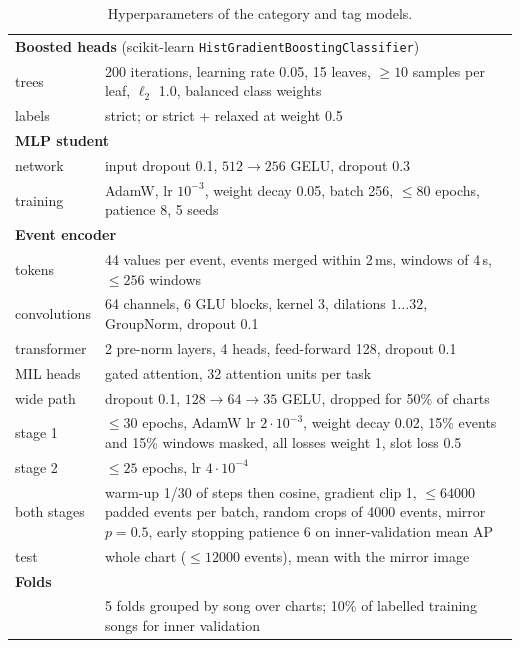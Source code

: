 \begin{table}[H]
\centering\footnotesize
\caption{Hyperparameters of the category and tag models.}
\label{tab:hparams}
\setlength\tabcolsep{4pt}
\begin{tabular}{p{}p{}}
\toprule
\multicolumn{2}{l}{\textbf{Boosted heads} (scikit-learn \texttt{HistGradientBoostingClassifier})} \\
trees & 200 iterations, learning rate 0.05, 15 leaves, $\ge10$ samples per leaf, $\ell_2$ 1.0, balanced class weights \\
labels & strict; or strict + relaxed at weight 0.5 \\
\midrule
\multicolumn{2}{l}{\textbf{MLP student}} \\
network & input dropout 0.1, $512\to256$ GELU, dropout 0.3 \\
training & AdamW, lr $10^{-3}$, weight decay 0.05, batch 256, $\le80$ epochs, patience 8, 5 seeds \\
\midrule
\multicolumn{2}{l}{\textbf{Event encoder}} \\
tokens & 44 values per event, events merged within 2\,ms, windows of 4\,s, $\le256$ windows \\
convolutions & 64 channels, 6 GLU blocks, kernel 3, dilations $1\dots32$, GroupNorm, dropout 0.1 \\
transformer & 2 pre-norm layers, 4 heads, feed-forward 128, dropout 0.1 \\
MIL heads & gated attention, 32 attention units per task \\
wide path & dropout 0.1, $128\to64\to35$ GELU, dropped for 50\% of charts \\
stage 1 & $\le30$ epochs, AdamW lr $2\cdot10^{-3}$, weight decay 0.02, 15\% events and 15\% windows masked, all losses weight 1, slot loss 0.5 \\
stage 2 & $\le25$ epochs, lr $4\cdot10^{-4}$ \\
both stages & warm-up 1/30 of steps then cosine, gradient clip 1, $\le\num{64000}$ padded events per batch, random crops of \num{4000} events, mirror $p=0.5$, early stopping patience 6 on inner-validation mean AP \\
test & whole chart ($\le\num{12000}$ events), mean with the mirror image \\
\midrule
\multicolumn{2}{l}{\textbf{Folds}} \\
& 5 folds grouped by song over \nCharts{} charts; 10\% of labelled training songs for inner validation \\
\bottomrule
\end{tabular}
\end{table}

